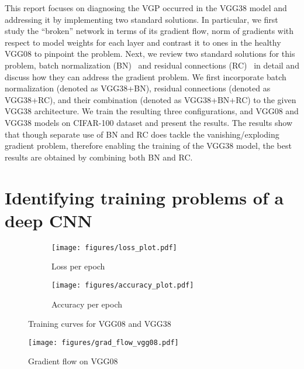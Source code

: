 \documentclass{article}
\begin{document}
This report focuses on diagnosing the VGP occurred in the VGG38 model and addressing
it by implementing two standard solutions.
In particular, we first study the ``broken''
network in terms of its gradient flow, norm of gradients with respect to
model weights for each layer and contrast it 
to ones in the healthy VGG08 to pinpoint the problem.
Next, we review two standard solutions for this problem, 
batch normalization (BN)~\cite{ioffe2015batch} and residual connections (RC)~\cite{he2016deep}
in detail and discuss how they can address the gradient problem.
We first incorporate batch normalization (denoted as VGG38+BN), 
residual connections (denoted as VGG38+RC), 
and their combination (denoted as VGG38+BN+RC) to the given VGG38 architecture.
We train the resulting three configurations, and VGG08 and VGG38 models on 
CIFAR-100 dataset and present the results.
The results show that though separate use of BN and RC does tackle 
the vanishing/exploding gradient problem, therefore enabling the training of the VGG38 model, 
the best results are obtained by combining both BN and RC.

%


\section{Identifying training problems of a deep CNN}
\label{sec:task1}

\begin{figure}[t]
    \begin{subfigure}{\linewidth}
        \centering
        \texttt{[image: figures/loss\_plot.pdf]}
        \caption{Loss per epoch}
        \label{fig:loss_curves}
    \end{subfigure}

    \begin{subfigure}{\linewidth}
        \centering
        \texttt{[image: figures/accuracy\_plot.pdf]}
        \caption{Accuracy per epoch}
        \label{fig:acc_curves}
    \end{subfigure}
    \caption{Training curves for VGG08 and VGG38}
    \label{fig:curves}
\end{figure}

\begin{figure}[t]
    \centering
    \texttt{[image: figures/grad\_flow\_vgg08.pdf]}
    \caption{Gradient flow on VGG08}
    \label{fig:grad_flow_08}
\end{figure}

\questionFigureThree
\end{document}
